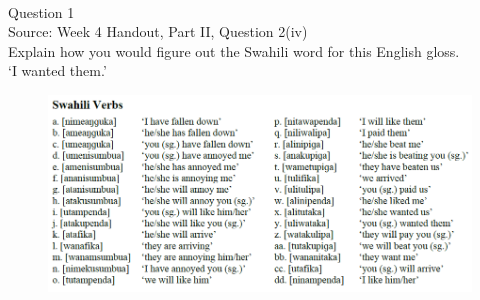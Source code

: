 \documentclass[12pt]{article}
\begin{document}
\newpage

\begin{center}
\textbf{{\color{red}{\HUGE END OF EXAM}}}\\

\end{center}
\newpage

\begin{center}
\textbf{{\color{blue}{\HUGE START OF EXAM\\}}}

\textbf{{\color{blue}{\HUGE Student ID: empty\\}}}

\textbf{{\color{blue}{\HUGE 9:20\\}}}

\end{center}
\newpage

\begin{center}
\textbf{{\color{blue}{\HUGE START OF EXAM\\}}}

\textbf{{\color{blue}{\HUGE Student ID: 54112\\}}}

\textbf{{\color{blue}{\HUGE 9:30\\}}}

\end{center}
\newpage

{\large Question 1}\\

Source: Week 4 Handout, Part II, Question 2(iv)\\

Explain how you would figure out the Swahili word for this English gloss.\\

‘I wanted them.’

\begin{figure}[H]
\includegraphics{../images/swahiliverbs.png}
\end{figure}
\end{document}
